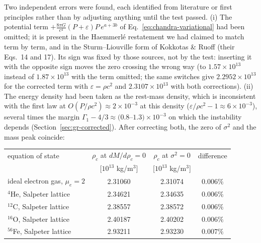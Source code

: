 \documentclass[11pt]{article}
\begin{document}
Two independent errors were found, each identified from literature or first principles rather than by adjusting anything until the test passed. (i) The potential term $+\frac{8\pi G}{c^4}(P+\varepsilon)P\,e^{a+3b}$ of Eq.~\eqref{eq:chandra-variational} had been omitted; it is present in the Haemmerl\'e restatement we had claimed to match term by term, and in the Sturm--Liouville form of Kokkotas \& Ruoff (their Eqs.~14 and 17). Its sign was fixed by those sources, not by the test: inserting it with the opposite sign moves the zero crossing the wrong way (to $1.57\times10^{13}$ instead of $1.87\times10^{13}$ with the term omitted; the same switches give $2.2952\times10^{13}$ for the corrected term with $\varepsilon=\rho c^2$ and $2.3107\times10^{13}$ with both corrections). (ii) The energy density had been taken as the rest-mass density, which is inconsistent with the first law at $O(P/\rho c^2)\approx2\times10^{-3}$ at this density ($\varepsilon/\rho c^2-1\approx6\times10^{-3}$), several times the margin $\Gamma_1-4/3\approx(0.8$--$1.3)\times10^{-3}$ on which the instability depends (Section~\ref{sec:gr-corrected}). After correcting both, the zero of $\sigma^2$ and the mass peak coincide:

\begin{center}
\small
\begin{tabular}{lccc}
\hline
equation of state & $\rho_c$ at $dM/d\rho_c=0$ & $\rho_c$ at $\sigma^2=0$ & difference \\
 & [$10^{13}$ kg/m$^3$] & [$10^{13}$ kg/m$^3$] & \\
\hline
ideal electron gas, $\mu_e=2$ & 2.31060 & 2.31074 & $0.006\%$ \\
$^{4}$He, Salpeter lattice & 2.34621 & 2.34635 & $0.006\%$ \\
$^{12}$C, Salpeter lattice & 2.38557 & 2.38572 & $0.006\%$ \\
$^{16}$O, Salpeter lattice & 2.40187 & 2.40202 & $0.006\%$ \\
$^{56}$Fe, Salpeter lattice & 2.93211 & 2.93230 & $0.007\%$ \\
\hline
\end{tabular}
\end{center}
\end{document}
